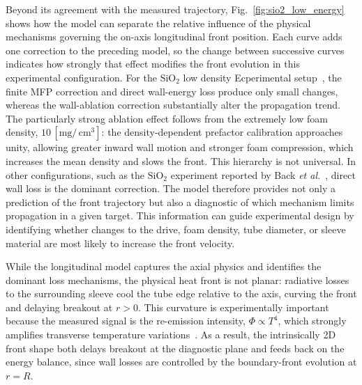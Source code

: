 \documentclass[prl, twocolumn, superscriptaddress, amsmath, amssymb, reprint]{revtex4-2}
\begin{document}
Beyond its agreement with the measured trajectory, Fig.~\ref{fig:sio2_low_energy} shows how the model can separate the relative influence of the physical mechanisms governing the on-axis longitudinal front position. Each curve adds one correction to the preceding model, so the change between successive curves indicates how strongly that effect modifies the front evolution in this experimental configuration. For the $\mathrm{SiO}_2$ low density Ecperimental setup~\cite{Back2000PRL}, the finite MFP correction and direct wall-energy loss produce only small changes, whereas the wall-ablation correction substantially alter the propagation trend. The particularly strong ablation effect follows from the extremely low foam density, $10\,[\mathrm{mg/\,cm^{3}}]$: the density-dependent prefactor calibration approaches unity, allowing greater inward wall motion and stronger foam compression, which increases the mean density and slows the front. This hierarchy is not universal. In other configurations, such as the $\mathrm{SiO}_2$ experiment reported by Back \textit{et al.}~\cite{Back2000POP}, direct wall loss is the dominant correction. The model therefore provides not only a prediction of the front trajectory but also a diagnostic of which mechanism limits propagation in a given target. This information can guide experimental design by identifying whether changes to the drive, foam density, tube diameter, or sleeve material are most likely to increase the front velocity.

While the longitudinal model captures the axial physics and identifies the dominant loss mechanisms, the physical heat front is not planar: radiative losses to the surrounding sleeve cool the tube edge relative to the axis, curving the front and delaying breakout at $r>0$. This curvature is experimentally important because the measured signal is the re-emission intensity, $\Phi\propto T^4$, which strongly amplifies transverse temperature variations~\cite{Back2000POP,Back2000PRL}. As a result, the intrinsically 2D front shape both delays breakout at the diagnostic plane and feeds back on the energy balance, since wall losses are controlled by the boundary-front evolution at $r=R$.
\end{document}
